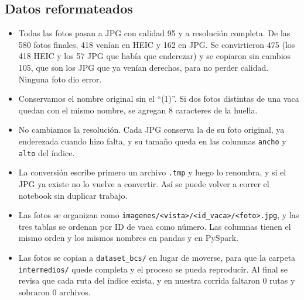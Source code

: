 \subsection{Datos reformateados}\label{sec:reformateados}

\begin{itemize}
  \item Todas las fotos pasan a JPG con calidad 95 y a resolución completa. De las 580 fotos finales, 418 venían en HEIC y 162 en JPG. Se convirtieron 475 (los 418 HEIC y los 57 JPG que había que enderezar) y se copiaron sin cambios 105, que son los JPG que ya venían derechos, para no perder calidad. Ninguna foto dio error.
  \item Conservamos el nombre original sin el ``(1)''. Si dos fotos distintas de una vaca quedan con el mismo nombre, se agregan 8 caracteres de la huella.
  \item No cambiamos la resolución. Cada JPG conserva la de su foto original, ya enderezada cuando hizo falta, y su tamaño queda en las columnas \texttt{ancho} y \texttt{alto} del índice.
  \item La conversión escribe primero un archivo \nolinkurl{.tmp} y luego lo renombra, y si el JPG ya existe no lo vuelve a convertir. Así se puede volver a correr el notebook sin duplicar trabajo.
  \item Las fotos se organizan como \nolinkurl{imagenes/<vista>/<id_vaca>/<foto>.jpg}, y las tres tablas se ordenan por ID de vaca como número. Las columnas tienen el mismo orden y los mismos nombres en pandas y en PySpark.
  \item Las fotos se copian a \nolinkurl{dataset_bcs/} en lugar de moverse, para que la carpeta \nolinkurl{intermedios/} quede completa y el proceso se pueda reproducir. Al final se revisa que cada ruta del índice exista, y en nuestra corrida faltaron 0 rutas y sobraron 0 archivos.
\end{itemize}
